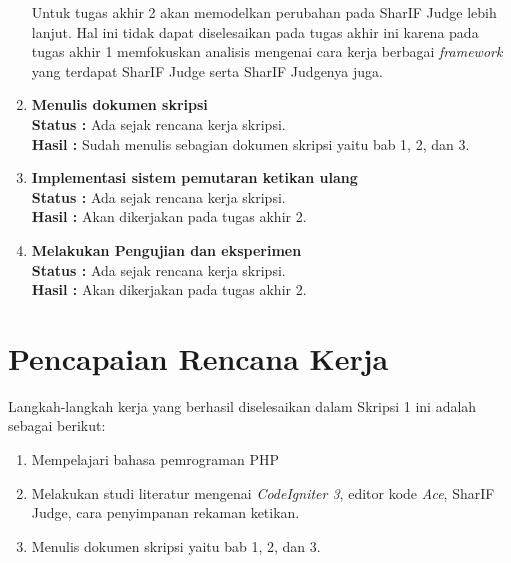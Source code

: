 \documentclass[a4paper,twoside]{article}
\begin{document}
\begin{enumerate}
	      Untuk tugas akhir 2 akan memodelkan perubahan pada SharIF Judge lebih lanjut. Hal ini tidak dapat diselesaikan pada tugas akhir ini karena pada tugas akhir 1 memfokuskan analisis mengenai cara kerja berbagai \textit{framework} yang terdapat SharIF Judge serta SharIF Judgenya juga.

	\item \textbf{Menulis dokumen skripsi}\\
	      {\bf Status :} Ada sejak rencana kerja skripsi.\\
	      {\bf Hasil :} Sudah menulis sebagian dokumen skripsi yaitu bab 1, 2, dan 3.

	\item \textbf{Implementasi sistem pemutaran ketikan ulang}\\
	      {\bf Status :} Ada sejak rencana kerja skripsi.\\
	      {\bf Hasil :} Akan dikerjakan pada tugas akhir 2.

	\item \textbf{Melakukan Pengujian dan eksperimen}\\
	      {\bf Status :} Ada sejak rencana kerja skripsi.\\
	      {\bf Hasil :} Akan dikerjakan pada tugas akhir 2.


\end{enumerate}

\section{Pencapaian Rencana Kerja}
Langkah-langkah kerja yang berhasil diselesaikan dalam Skripsi 1 ini adalah sebagai berikut:
\begin{enumerate}
	\item Mempelajari bahasa pemrograman PHP
	\item Melakukan studi literatur mengenai \textit{CodeIgniter 3}, editor kode \textit{Ace}, SharIF Judge, cara penyimpanan rekaman ketikan.
	\item Menulis dokumen skripsi yaitu bab 1, 2, dan 3.
\end{enumerate}
\end{document}
